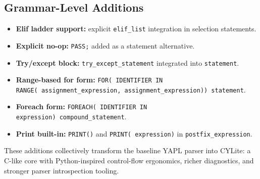 \documentclass[a4paper,12pt]{article}
\begin{document}
\subsection{Grammar-Level Additions}
\begin{itemize}
    \item \textbf{Elif ladder support:} explicit \texttt{elif\_list} integration in selection statements.
    \item \textbf{Explicit no-op:} \texttt{PASS\textquotesingle;\textquotesingle} added as a statement alternative.
    \item \textbf{Try/except block:} \texttt{try\_except\_statement} integrated into \texttt{statement}.
    \item \textbf{Range-based for form:} \texttt{FOR\textquotesingle(\textquotesingle\ IDENTIFIER IN RANGE\textquotesingle(\textquotesingle\ assignment\_expression\textquotesingle,\textquotesingle\ assignment\_expression\textquotesingle)\textquotesingle\textquotesingle)\textquotesingle\ statement}.
    \item \textbf{Foreach form:} \texttt{FOREACH\textquotesingle(\textquotesingle\ IDENTIFIER IN expression\textquotesingle)\textquotesingle\ compound\_statement}.
    \item \textbf{Print built-in:} \texttt{PRINT\textquotesingle(\textquotesingle\textquotesingle)\textquotesingle} and \texttt{PRINT\textquotesingle(\textquotesingle\ expression\textquotesingle)\textquotesingle} in \texttt{postfix\_expression}.
\end{itemize}


These additions collectively transform the baseline YAPL parser into CYLite: a C-like core with Python-inspired control-flow ergonomics, richer diagnostics, and stronger parser introspection tooling.
\end{document}
